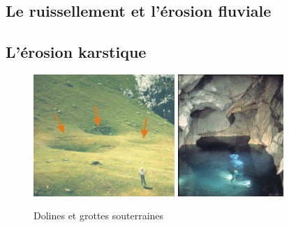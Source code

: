 \documentclass{beamer}
\begin{document}
\subsection{Le ruissellement et l'érosion fluviale}
\begin{frame}
 \begin{center}
  \begin{figure}
  \end{figure}
 \end{center}
\end{frame}

\subsection{L'érosion karstique}
\begin{frame}
  \begin{center}
    \begin{figure}[h]
      \includegraphics[width=5.35cm]{Images/Diapos/Erosion/Karstique/dolines.jpg}
      \includegraphics[width=4cm]{Images/Diapos/Erosion/Karstique/erosion-karstique-fig04.jpg}
      \caption{Dolines et grottes souterraines}
    \end{figure}
  \end{center}
\end{frame}
\end{document}
